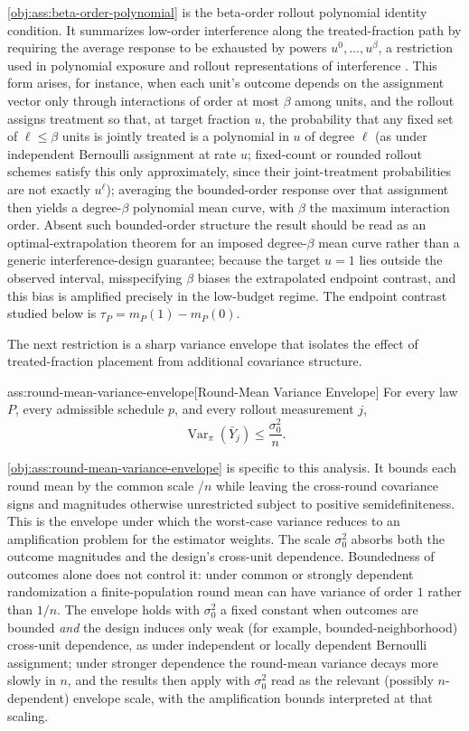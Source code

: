 \cref{obj:ass:beta-order-polynomial} is the beta-order rollout polynomial identity condition. It summarizes low-order interference along the treated-fraction path by requiring the average response to be exhausted by powers \(u^0,\ldots,u^\beta\), a restriction used in polynomial exposure and rollout representations of interference \citep{cortez2022}. This form arises, for instance, when each unit's outcome depends on the assignment vector only through interactions of order at most \(\beta\) among units, and the rollout assigns treatment so that, at target fraction \(u\), the probability that any fixed set of \(\ell\le\beta\) units is jointly treated is a polynomial in \(u\) of degree \(\ell\) (as under independent Bernoulli assignment at rate \(u\); fixed-count or rounded rollout schemes satisfy this only approximately, since their joint-treatment probabilities are not exactly \(u^\ell\)); averaging the bounded-order response over that assignment then yields a degree-\(\beta\) polynomial mean curve, with \(\beta\) the maximum interaction order. Absent such bounded-order structure the result should be read as an optimal-extrapolation theorem for an imposed degree-\(\beta\) mean curve rather than a generic interference-design guarantee; because the target \(u=1\) lies outside the observed interval, misspecifying \(\beta\) biases the extrapolated endpoint contrast, and this bias is amplified precisely in the low-budget regime. The endpoint contrast studied below is \(\tau_P=m_P(1)-m_P(0)\).

The next restriction is a sharp variance envelope that isolates the effect of treated-fraction placement from additional covariance structure.

\begin{assumptionv}{ass:round-mean-variance-envelope}[Round-Mean Variance Envelope]
For every law \(P\), every admissible schedule \(p\), and every rollout measurement \(j\),
\[
\operatorname{Var}_\pi(\bar Y_j)\le \frac{\sigma_0^2}{n}.
\]
\end{assumptionv}

\cref{obj:ass:round-mean-variance-envelope} is specific to this analysis. It bounds each round mean by the common scale /\(n\) while leaving the cross-round covariance signs and magnitudes otherwise unrestricted subject to positive semidefiniteness. This is the envelope under which the worst-case variance reduces to an amplification problem for the estimator weights. The scale \(\sigma_0^2\) absorbs both the outcome magnitudes and the design's cross-unit dependence. Boundedness of outcomes alone does not control it: under common or strongly dependent randomization a finite-population round mean can have variance of order \(1\) rather than \(1/n\). The envelope holds with \(\sigma_0^2\) a fixed constant when outcomes are bounded \emph{and} the design induces only weak (for example, bounded-neighborhood) cross-unit dependence, as under independent or locally dependent Bernoulli assignment; under stronger dependence the round-mean variance decays more slowly in \(n\), and the results then apply with \(\sigma_0^2\) read as the relevant (possibly \(n\)-dependent) envelope scale, with the amplification bounds interpreted at that scaling.

